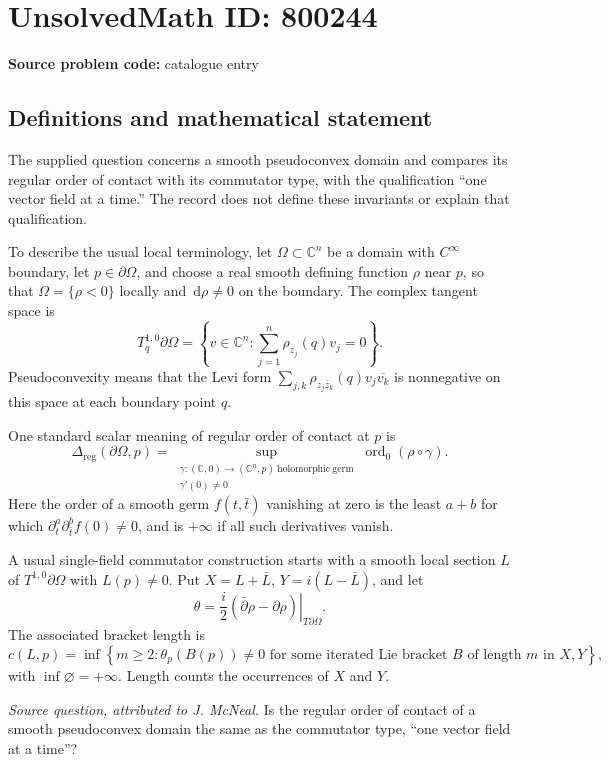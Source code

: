 \documentclass[11pt]{article}
\newcommand{\C}{\mathbb{C}}
\newcommand{\dd}{\,\mathrm{d}}
\begin{document}
\section*{UnsolvedMath ID: 800244}
\textbf{Source problem code:} catalogue entry
\subsection{Definitions and mathematical statement}
The supplied question concerns a smooth pseudoconvex domain and compares its regular order of contact with its commutator type, with the qualification ``one vector field at a time.'' The record does not define these invariants or explain that qualification.

To describe the usual local terminology, let \(\Omega\subset\C^n\) be a domain with \(C^\infty\) boundary, let \(p\in\partial\Omega\), and choose a real smooth defining function \(\rho\) near \(p\), so that \(\Omega=\{\rho<0\}\) locally and \(\dd\rho\ne0\) on the boundary. The complex tangent space is
\[
T_q^{1,0}\partial\Omega=\left\{v\in\C^n:\sum_{j=1}^n\rho_{z_j}(q)v_j=0\right\}.
\]
Pseudoconvexity means that the Levi form \(\sum_{j,k}\rho_{z_j\bar z_k}(q)v_j\overline{v_k}\) is nonnegative on this space at each boundary point \(q\).

One standard scalar meaning of regular order of contact at \(p\) is
\[
\Delta_{\mathrm{reg}}(\partial\Omega,p)
=\sup_{\substack{\gamma:(\C,0)\to(\C^n,p)\ \mathrm{holomorphic\ germ}\\\gamma'(0)\ne0}}
\operatorname{ord}_0(\rho\circ\gamma).
\]
Here the order of a smooth germ \(f(t,\bar t)\) vanishing at zero is the least \(a+b\) for which \(\partial_t^a\partial_{\bar t}^b f(0)\ne0\), and is \(+\infty\) if all such derivatives vanish.

A usual single-field commutator construction starts with a smooth local section \(L\) of \(T^{1,0}\partial\Omega\) with \(L(p)\ne0\). Put \(X=L+\bar L\), \(Y=i(L-\bar L)\), and let
\[
\theta=\left.\frac{i}{2}(\bar\partial\rho-\partial\rho)\right|_{T\partial\Omega}.
\]
The associated bracket length is
\[
c(L,p)=\inf\left\{m\ge2:\theta_p(B(p))\ne0\text{ for some iterated Lie bracket }B\text{ of length }m\text{ in }X,Y\right\},
\]
with \(\inf\varnothing=+\infty\). Length counts the occurrences of \(X\) and \(Y\).

\textit{Source question, attributed to J. McNeal.} Is the regular order of contact of a smooth pseudoconvex domain the same as the commutator type, ``one vector field at a time''?
\end{document}

